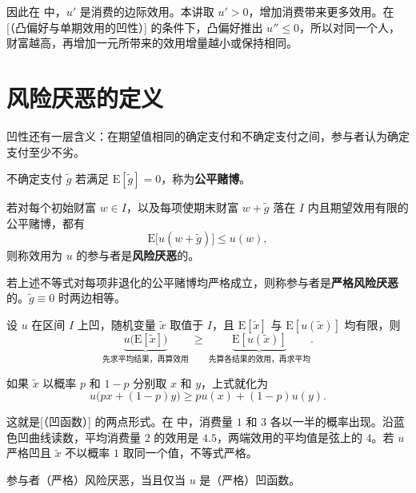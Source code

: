 因此在 中，$u'$ 是消费的边际效用。本讲取 $u'>0$，增加消费带来更多效用。在[（凸偏好与单期效用的凹性）] 的条件下，凸偏好推出 $u''\le 0$，所以对同一个人，财富越高，再增加一元所带来的效用增量越小或保持相同。

\section{风险厌恶的定义}\label{sec:wj-seven-2}
凹性还有一层含义：在期望值相同的确定支付和不确定支付之间，参与者认为确定支付至少不劣。

\begin{tcolorbox}[knowledge]
 不确定支付 $\tilde{g}$ 若满足 $\mathrm{E}[\tilde{g}]=0$，称为\textbf{公平赌博}。

 若对每个初始财富 $w\in I$，以及每项使期末财富 $w+\tilde g$ 落在 $I$ 内且期望效用有限的公平赌博，都有
\[
    \mathrm{E}\bigl[u(w+\tilde{g})\bigr]\le u(w),
\]
则称效用为 $u$ 的参与者是\textbf{风险厌恶}的。

若上述不等式对每项非退化的公平赌博均严格成立，则称参与者是\textbf{严格风险厌恶}的。$\tilde g\equiv0$ 时两边相等。
\end{tcolorbox}

\begin{tcolorbox}[knowledge,title=Jensen 不等式]
设 $u$ 在区间 $I$ 上凹，随机变量 $\tilde x$ 取值于 $I$，且 $\mathrm E[\tilde x]$ 与 $\mathrm E[u(\tilde x)]$ 均有限，则
\[
 \underbrace{u\bigl(\mathrm E[\tilde x]\bigr)}_{\text{先求平均结果，再算效用}}
 \ \ge\
 \underbrace{\mathrm E[u(\tilde x)]}_{\text{先算各结果的效用，再求平均}}.
\]

如果 $\tilde x$ 以概率 $p$ 和 $1-p$ 分别取 $x$ 和 $y$，上式就化为
\[
 u\bigl(px+(1-p)y\bigr)\ge pu(x)+(1-p)u(y).
\]

这就是[（凹函数）] 的两点形式。在 中，消费量 $1$ 和 $3$ 各以一半的概率出现。沿蓝色凹曲线读数，平均消费量 $2$ 的效用是 $4.5$，两端效用的平均值是弦上的 $4$。若 $u$ 严格凹且 $\tilde x$ 不以概率 $1$ 取同一个值，不等式严格。
\end{tcolorbox}

\begin{tcolorbox}[knowledge]
 参与者（严格）风险厌恶，当且仅当 $u$ 是（严格）凹函数。
\end{tcolorbox}

